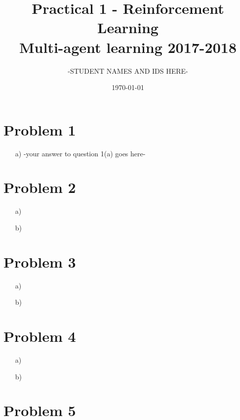 \documentclass[12pt]{article}
\title{Practical 1 - Reinforcement Learning \\
	\large Multi-agent learning 2017-2018}
\author{-STUDENT NAMES AND IDS HERE-}
\date{\today}
\begin{document}
\maketitle

\section*{Problem 1}

\begin{enumerate}
	\item[a)]
	-your answer to question 1(a) goes here-
\end{enumerate}

\section*{Problem 2}
\begin{enumerate}
	\item[a)]
	\item[b)]
\end{enumerate}

\section*{Problem 3}

\begin{enumerate}
	\item[a)]
	\item[b)]
\end{enumerate}

\section*{Problem 4}

\begin{enumerate}
	\item[a)]
	\item[b)]
\end{enumerate}

\section*{Problem 5}
\end{document}
